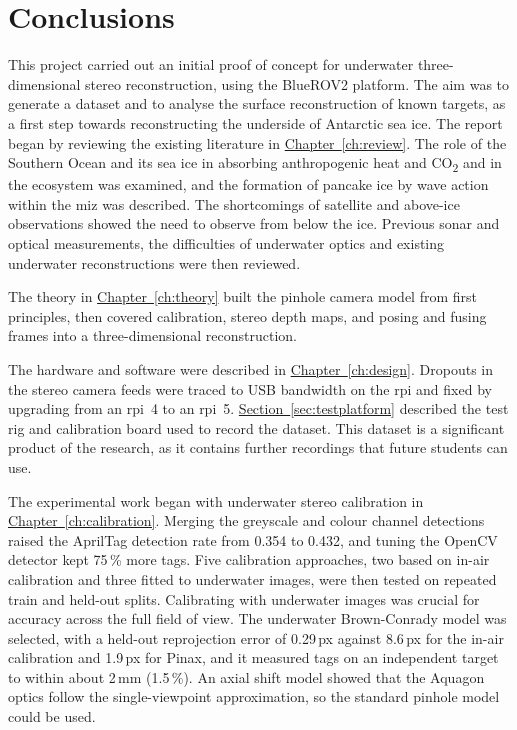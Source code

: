 \chapter{Conclusions}
\label{ch:conclusions}
This project carried out an initial proof of concept for underwater three-dimensional stereo reconstruction, using
the BlueROV2 platform. The aim was to generate a dataset and to analyse the surface reconstruction of
known targets, as a first step towards reconstructing the underside of Antarctic sea ice.
The report began by reviewing the existing literature in \hyperref[ch:review]{Chapter~\ref*{ch:review}}. The role of the Southern Ocean
and its sea ice in absorbing anthropogenic heat and CO\textsubscript{2} and in the ecosystem was examined, and the
formation of pancake ice by wave action within the \gls{miz} was described. The shortcomings of satellite and
above-ice observations showed the need to observe from below the ice. Previous sonar and optical measurements,
the difficulties of underwater optics and existing underwater reconstructions were then reviewed.

The theory in \hyperref[ch:theory]{Chapter~\ref*{ch:theory}} built the pinhole camera model from first principles, then covered
calibration, stereo depth maps, and posing and fusing frames into a three-dimensional reconstruction.

The hardware and software were described in \hyperref[ch:design]{Chapter~\ref*{ch:design}}. Dropouts in the stereo camera feeds were
traced to USB bandwidth on the \gls{rpi} and fixed by upgrading from an \gls{rpi}~4 to an \gls{rpi}~5.
\hyperref[sec:testplatform]{Section~\ref*{sec:testplatform}} described the test rig and calibration board used to record the dataset. This dataset is
a significant product of the research, as it contains further recordings that future students can use.

The experimental work began with underwater stereo calibration in \hyperref[ch:calibration]{Chapter~\ref*{ch:calibration}}. Merging the
greyscale and colour channel detections raised the AprilTag detection rate from 0.354 to 0.432, and tuning the
OpenCV detector kept 75\,\% more tags. Five calibration approaches, two based on in-air calibration and three
fitted to underwater images, were then tested on repeated train and held-out splits. Calibrating with underwater
images was crucial for accuracy across the full field of view. The underwater Brown-Conrady model was
selected, with a held-out reprojection error of 0.29\,px against 8.6\,px for the in-air calibration and 1.9\,px for
Pinax, and it measured tags on an independent target to within about 2\,mm (1.5\,\%). An axial shift model showed
that the Aquagon optics follow the single-viewpoint approximation, so the standard pinhole model could be used.

